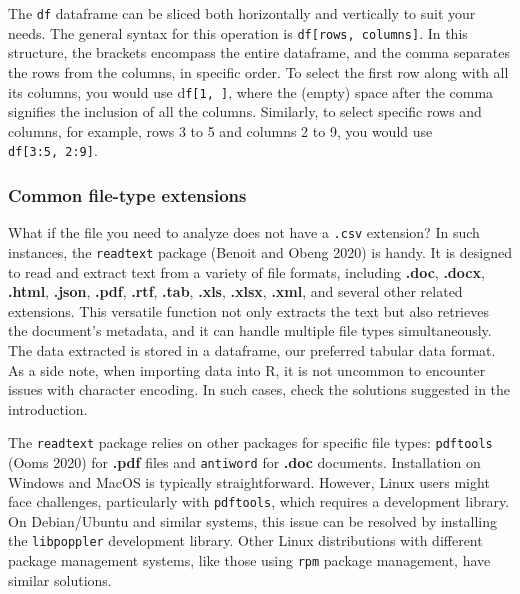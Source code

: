 The \texttt{df} dataframe can be sliced both horizontally and vertically
to suit your needs. The general syntax for this operation is
\texttt{df{[}rows,\ columns{]}}. In this structure, the brackets
encompass the entire dataframe, and the comma separates the rows from
the columns, in specific order. To select the first row along with
all its columns, you would use d\texttt{f{[}1,\ {]}}, where the (empty)
space after the comma signifies the inclusion of all the columns. Similarly,
to select specific rows and columns, for example, rows 3 to 5 and
columns 2 to 9, you would use \texttt{df{[}3:5,\ 2:9{]}}.

\subsubsection{Common file-type
extensions}\label{common-file-type-extensions}

What if the file you need to analyze does not have a \texttt{.csv}
extension? In such instances, the \texttt{readtext} package (Benoit and
Obeng 2020) is handy. It is designed to read and extract text from a
variety of file formats, including \textbf{.doc}, \textbf{.docx},
\textbf{.html}, \textbf{.json}, \textbf{.pdf}, \textbf{.rtf},
\textbf{.tab}, \textbf{.xls}, \textbf{.xlsx}, \textbf{.xml}, and several
other related extensions. This versatile function not only extracts the
text but also retrieves the document's metadata, and it can handle
multiple file types simultaneously. The data extracted is stored in a
dataframe, our preferred tabular data format. As a side note, when
importing data into R, it is not uncommon to encounter issues with
character encoding. In such cases, check the solutions suggested in the
introduction.

The \texttt{readtext} package relies on other packages for specific file
types: \texttt{pdftools} (Ooms 2020) for \textbf{.pdf} files and
\texttt{antiword} for \textbf{.doc} documents. Installation on Windows
and MacOS is typically straightforward. However, Linux users might face
challenges, particularly with \texttt{pdftools}, which requires a
development library. On Debian/Ubuntu and similar systems, this issue
can be resolved by installing the \texttt{libpoppler} development
library. Other Linux distributions with different package management
systems, like those using \texttt{rpm} package management, have
similar solutions.

\begin{Shaded}
\begin{Highlighting}[]
\end{Highlighting}
\end{Shaded}

